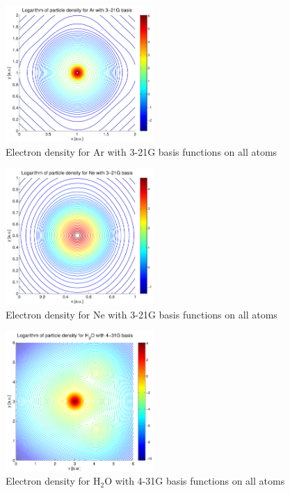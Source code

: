 \documentclass[a4paper,10pt, twocolumn, pre]{revtex4}
\begin{document}
\begin{figure}[h!tb]
\includegraphics[width=0.5\textwidth]{./figures/Ardensity_321g.pdf}
\caption{Electron density for Ar with 3-21G basis functions on all atoms}
\label{fig:density3}
\end{figure}

\begin{figure}[h!tb]
\includegraphics[width=0.5\textwidth]{./figures/Nedensity_321g.pdf}
\caption{Electron density for Ne with 3-21G basis functions on all atoms}
\label{fig:density4}
\end{figure}

\begin{figure}[h!tb]
\includegraphics[width=0.5\textwidth]{./figures/H2Odensity_431g.pdf}
\caption{Electron density for H$_2$O with 4-31G basis functions on all atoms}
\label{fig:density5}
\end{figure}
\end{document}
